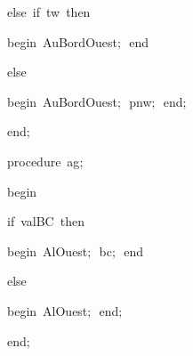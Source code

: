 {\vspace{\neglskip}\mbox{\blc  \blk\blk\idt  \mcl else\idt \ \mcl if\idt \ tw\ \mcl then\idt }\par 
\vspace{\neglskip}\mbox{\blc  \blk\blk\blk\idt  \mcl begin\idt \ AuBordOuest$;$\ \mcl end\idt }\par 
\pagebreak[3] 
\vspace{\neglskip}\mbox{\blc  \blk\blk\idt  \mcl else\idt }\par 
\vspace{\neglskip}\mbox{\blc  \blk\blk\blk\idt  \mcl begin\idt \ AuBordOuest$;$\ pnw$;$\ \mcl end\idt $;$}\par 
\vspace{\neglskip}\mbox{\blc  \blk\idt  \mcl end\idt $;$}\par 
\medskip

\pagebreak[3] 
\vspace{\neglskip}\mbox{\blc  \blk\idt  \mcl procedure\idt \ ag$;$}\par 
\vspace{\neglskip}\mbox{\blc  \blk\idt  \mcl begin\idt }\par 
\pagebreak[3] 
\vspace{\neglskip}\mbox{\blc  \blk\blk\idt  \mcl if\idt \ valBC\ \mcl then\idt }\par 
\vspace{\neglskip}\mbox{\blc  \blk\blk\blk\idt  \mcl begin\idt \ AlOuest$;$\ bc$;$\ \mcl end\idt }\par 
\pagebreak[3] 
\vspace{\neglskip}\mbox{\blc  \blk\blk\idt  \mcl else\idt }\par 
\vspace{\neglskip}\mbox{\blc  \blk\blk\blk\idt  \mcl begin\idt \ AlOuest$;$\ \mcl end\idt $;$}\par 
\vspace{\neglskip}\mbox{\blc  \blk\idt  \mcl end\idt $;$}\par 
\medskip }

